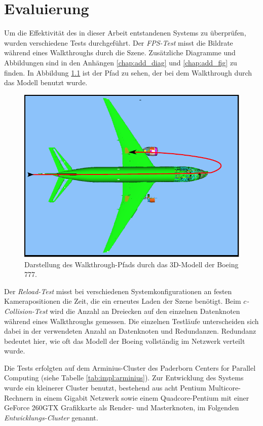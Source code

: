 \chapter{Evaluierung}
\label{chap:eval}
%

Um die Effektivität des in dieser Arbeit entstandenen Systems zu überprüfen, wurden verschiedene Tests durchgeführt.
Der \textit{FPS-Test} misst die Bildrate während eines Walkthroughs durch die Szene. 
Zusätzliche Diagramme und Abbildungen sind in den Anhängen \ref{chap:add_diag} und \ref{chap:add_fig} zu finden. In Abbildung \ref{fig:eval:walkthrough1} ist der Pfad zu sehen, der bei dem Walkthrough durch das Modell benutzt wurde. 
\begin{figure}[h]
\centering
\includegraphics[scale=1.0]{images/walkthrough1.pdf}
  \caption[Walkthrough-Pfad]{\label{fig:eval:walkthrough1} Darstellung des Walkthrough-Pfads durch das 3D-Modell der Boeing 777.}
\end{figure}
Der \emph{Reload-Test} misst bei verschiedenen Systemkonfigurationen an festen Kamerapositionen die Zeit, die ein erneutes Laden der Szene benötigt. Beim \emph{$c$-Collision-Test} wird die Anzahl an Dreiecken auf den einzelnen Datenknoten während eines Walkthroughs gemessen. Die einzelnen Testläufe unterscheiden sich dabei in der verwendeten Anzahl an Datenknoten und Redundanzen. Redundanz bedeutet hier, wie oft das Modell der Boeing vollständig im Netzwerk verteilt wurde. 

Die Tests erfolgten auf dem Arminius-Cluster des Paderborn Centers for Parallel Computing (siehe Tabelle \ref{tab:impl:arminius}). Zur Entwicklung des Systems wurde ein kleinerer Cluster benutzt, bestehend aus acht Pentium Multicore-Rechnern in einem Gigabit Netzwerk sowie einem Quadcore-Pentium mit einer GeForce 260GTX Grafikkarte als Render- und Masterknoten, im Folgenden \emph{Entwicklungs-Cluster} genannt.

